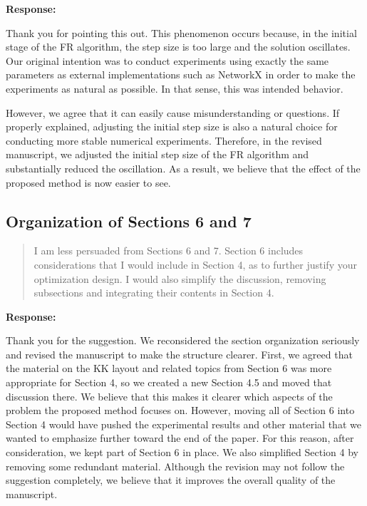 \documentclass[11pt]{article}
\newcommand{\reviewercomment}[1]{%
  \begin{quote}
  \color{blue}
  #1
  \end{quote}
}
\newenvironment{response}{%
  \noindent\textbf{Response:}%
}{%
  \medskip
}
\begin{document}
\begin{response}
  Thank you for pointing this out.
  This phenomenon occurs because, in the initial stage of the FR algorithm, the step size is too large and the solution oscillates. Our original intention was to conduct experiments using exactly the same parameters as external implementations such as NetworkX in order to make the experiments as natural as possible. In that sense, this was intended behavior.

  However, we agree that it can easily cause misunderstanding or questions. If properly explained, adjusting the initial step size is also a natural choice for conducting more stable numerical experiments. Therefore, in the revised manuscript, we adjusted the initial step size of the FR algorithm and substantially reduced the oscillation. As a result, we believe that the effect of the proposed method is now easier to see.
\end{response}

\subsection{Organization of Sections 6 and 7}

\reviewercomment{
  I am less persuaded from Sections 6 and 7.
  Section 6 includes considerations that I would include in Section 4, as to further justify your optimization design.
  I would also simplify the discussion, removing subsections and integrating their contents in Section 4.
}

\begin{response}
  Thank you for the suggestion. We reconsidered the section organization seriously and revised the manuscript to make the structure clearer.
  First, we agreed that the material on the KK layout and related topics from Section 6 was more appropriate for Section 4, so we created a new Section 4.5 and moved that discussion there. We believe that this makes it clearer which aspects of the problem the proposed method focuses on.
  However, moving all of Section 6 into Section 4 would have pushed the experimental results and other material that we wanted to emphasize further toward the end of the paper. For this reason, after consideration, we kept part of Section 6 in place. We also simplified Section 4 by removing some redundant material. Although the revision may not follow the suggestion completely, we believe that it improves the overall quality of the manuscript.
\end{response}
\end{document}
